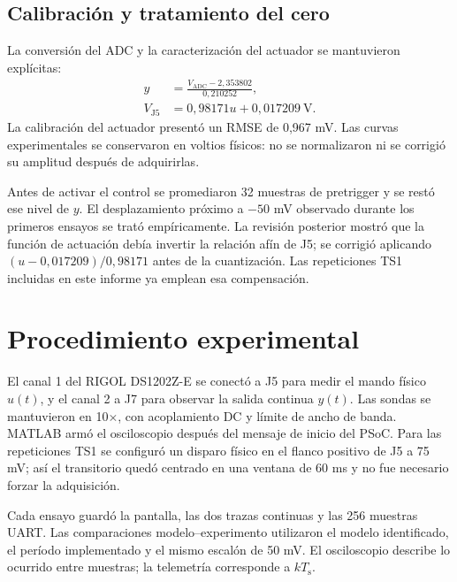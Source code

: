 \documentclass[10pt,twocolumn]{article}
\newcommand{\Ts}{T_{\mathrm{s}}}
\begin{document}
\subsection{Calibración y tratamiento del cero}
La conversión del ADC y la caracterización del actuador se mantuvieron explícitas:
\begin{align}
y&=\frac{V_{\mathrm{ADC}}-2,353802}{0,210252},\\
V_{\mathrm{J5}}&=0,98171u+0,017209\ \mathrm{V}.
\end{align}
La calibración del actuador presentó un RMSE de 0,967 mV. Las curvas experimentales se conservaron en voltios físicos: no se normalizaron ni se corrigió su amplitud después de adquirirlas.

Antes de activar el control se promediaron 32 muestras de pretrigger y se restó ese nivel de \(y\). El desplazamiento próximo a \(-50\) mV observado durante los primeros ensayos se trató empíricamente. La revisión posterior mostró que la función de actuación debía invertir la relación afín de J5; se corrigió aplicando \((u-0,017209)/0,98171\) antes de la cuantización. Las repeticiones TS1 incluidas en este informe ya emplean esa compensación.

\section{Procedimiento experimental}
El canal 1 del RIGOL DS1202Z-E se conectó a J5 para medir el mando físico \(u(t)\), y el canal 2 a J7 para observar la salida continua \(y(t)\). Las sondas se mantuvieron en 10\(\times\), con acoplamiento DC y límite de ancho de banda. MATLAB armó el osciloscopio después del mensaje de inicio del PSoC. Para las repeticiones TS1 se configuró un disparo físico en el flanco positivo de J5 a 75 mV; así el transitorio quedó centrado en una ventana de 60 ms y no fue necesario forzar la adquisición.

Cada ensayo guardó la pantalla, las dos trazas continuas y las 256 muestras UART. Las comparaciones modelo--experimento utilizaron el modelo identificado, el período implementado y el mismo escalón de 50 mV. El osciloscopio describe lo ocurrido entre muestras; la telemetría corresponde a \(k\Ts\).
\end{document}
